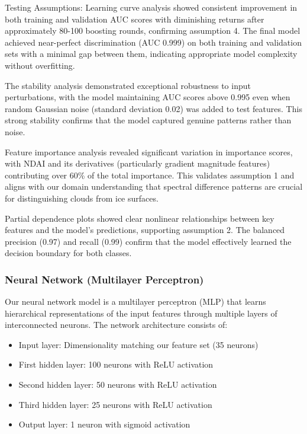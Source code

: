 \documentclass[10pt,letterpaper]{article}
\begin{document}
Testing Assumptions:
Learning curve analysis showed consistent improvement in both training and validation AUC scores with diminishing returns after approximately 80-100 boosting rounds, confirming assumption 4. The final model achieved near-perfect discrimination (AUC 0.999) on both training and validation sets with a minimal gap between them, indicating appropriate model complexity without overfitting.

The stability analysis demonstrated exceptional robustness to input perturbations, with the model maintaining AUC scores above 0.995 even when random Gaussian noise (standard deviation 0.02) was added to test features. This strong stability confirms that the model captured genuine patterns rather than noise.

Feature importance analysis revealed significant variation in importance scores, with NDAI and its derivatives (particularly gradient magnitude features) contributing over 60\% of the total importance. This validates assumption 1 and aligns with our domain understanding that spectral difference patterns are crucial for distinguishing clouds from ice surfaces.

Partial dependence plots showed clear nonlinear relationships between key features and the model's predictions, supporting assumption 2. The balanced precision (0.97) and recall (0.99) confirm that the model effectively learned the decision boundary for both classes.

\subsubsection{Neural Network (Multilayer Perceptron)}

Our neural network model is a multilayer perceptron (MLP) that learns hierarchical representations of the input features through multiple layers of interconnected neurons. The network architecture consists of:

\begin{itemize}
    \item Input layer: Dimensionality matching our feature set (35 neurons)
    \item First hidden layer: 100 neurons with ReLU activation
    \item Second hidden layer: 50 neurons with ReLU activation
    \item Third hidden layer: 25 neurons with ReLU activation
    \item Output layer: 1 neuron with sigmoid activation
\end{itemize}
\end{document}
